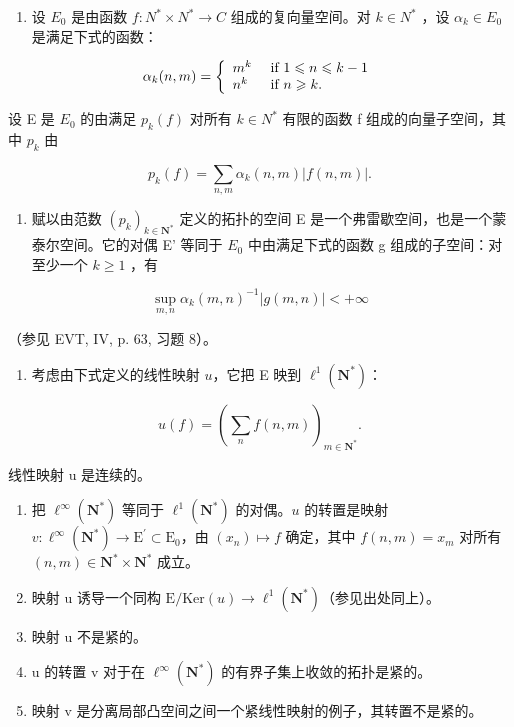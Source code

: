 \begin{enumerate}
\def\labelenumi{\arabic{enumi})}
\setcounter{enumi}{14}
\tightlist
\item
  设 \(E_{0}\) 是由函数 \(f: N^{*} \times N^{*} \to C\) 组成的复向量空间。对 \(k \in N^{*}\) ，设 \(\alpha_{k} \in E_{0}\) 是满足下式的函数：
\end{enumerate}

\[
\alpha_ {k} (n, m) = \left\{ \begin{array}{l l} m ^ {k} & \text { if } 1 \leqslant n \leqslant k - 1 \\ n ^ {k} & \text { if } n \geqslant k. \end{array} \right.
\]

设 E 是 \(E_{0}\) 的由满足 \(p_{k}(f)\) 对所有 \(k \in N^{*}\) 有限的函数 f 组成的向量子空间，其中 \(p_{k}\) 由

\[
p _ {k} (f) = \sum_ {n, m} \alpha_ {k} (n, m) | f (n, m) |.
\]

\begin{enumerate}
\def\labelenumi{\alph{enumi})}
\tightlist
\item
  赋以由范数 \((p_{k})_{k\in\mathbf{N}^{*}}\) 定义的拓扑的空间 E 是一个弗雷歇空间，也是一个蒙泰尔空间。它的对偶 E' 等同于 \(E_{0}\) 中由满足下式的函数 g 组成的子空间：对至少一个 \(k\geqslant1\) ，有
\end{enumerate}

\[
\sup _ {m, n} \alpha_ {k} (m, n) ^ {- 1} | g (m, n) | <   + \infty
\]

（参见 EVT, IV, p. 63, 习题 8）。

\begin{enumerate}
\def\labelenumi{\alph{enumi})}
\setcounter{enumi}{1}
\tightlist
\item
  考虑由下式定义的线性映射 \(u\)，它把 E 映到 \(\ell^1 (\mathbf{N}^*)\)：
\end{enumerate}

\[
u (f) = \left(\sum_ {n} f (n, m)\right) _ {m \in \mathbf {N} ^ {*}}.
\]

线性映射 u 是连续的。

\begin{enumerate}
\def\labelenumi{\alph{enumi})}
\setcounter{enumi}{2}
\item
  把 \(\ell^{\infty}(\mathbf{N}^{*})\) 等同于 \(\ell^{1}(\mathbf{N}^{*})\) 的对偶。\(u\) 的转置是映射 \(v\colon \ell^{\infty}(\mathbf{N}^{*})\to \mathrm{E}^{\prime}\subset \mathrm{E}_{0}\)，由 \((x_{n})\mapsto f\) 确定，其中 \(f(n,m) = x_{m}\) 对所有 \((n,m)\in \mathbf{N}^{*}\times \mathbf{N}^{*}\) 成立。
\item
  映射 u 诱导一个同构 \(\mathrm{E}/\mathrm{Ker}(u)\to\ell^{1}(\mathbf{N}^{*})\)（参见出处同上）。
\item
  映射 u 不是紧的。
\item
  u 的转置 v 对于在 \(\ell^{\infty}(\mathbf{N}^{*})\) 的有界子集上收敛的拓扑是紧的。
\item
  映射 v 是分离局部凸空间之间一个紧线性映射的例子，其转置不是紧的。
\end{enumerate}

